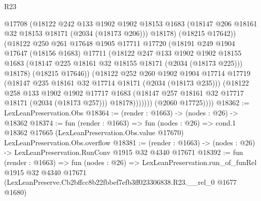\begin{lexlean}{R23}
\begin{coremodule}
                    @17708
                    (@18122
                      @242
                      @133
                      @1902
                      @1902
                      @18153
                      @1683
                      (@18147 @206 @18161 @32 @18153 @18171 (@2034 (@18173 @206)))
                      @18178)
                    (@18215 @17642))
                  (@18122
                    @250
                    @261
                    @17648
                    @1905
                    @17711
                    @17720
                    (@18191
                      @249
                      @1904
                      @17647
                      (@18156 @1683)
                      @17711
                      (@18122
                        @247
                        @133
                        @1902
                        @1902
                        @18155
                        @1683
                        (@18147 @225 @18161 @32 @18155 @18171 (@2034 (@18173 @225)))
                        @18178)
                      (@18215 @17646))
                    (@18122
                      @252
                      @260
                      @1902
                      @1904
                      @17714
                      @17719
                      (@18147 @235 @18161 @32 @17714 @18171 (@2034 (@18173 @235)))
                      (@18122
                        @258
                        @133
                        @1902
                        @1902
                        @17717
                        @1683
                        (@18147 @257 @18161 @32 @17717 @18171 (@2034 (@18173 @257)))
                        @18178)))))))
          (@2060 @17725))))
@18362 := LexLeanPreservation.Obs
@18364 := (render : @1663) -> (nodes : @26) -> @18362
@18374 := fun (render : @1663) =>
  fun (nodes : @26) =>
  cond.{1} @18362 @17665 (LexLeanPreservation.Obs.value @17670) LexLeanPreservation.Obs.overflow
@18381 := (render : @1663) -> (nodes : @26) -> LexLeanPreservation.RunConv @1915 @32 @4340 @17671
@18392 := fun (render : @1663) =>
  fun (nodes : @26) =>
  LexLeanPreservation.run_of_funRel
    @1915
    @32
    @4340
    @17671
    (LexLeanPreserve.Cb2bffcc8b22fbbef7efb3ff023306838.R23.__rel_0 @1677 @1680)
\end{coremodule}
\end{lexlean}
